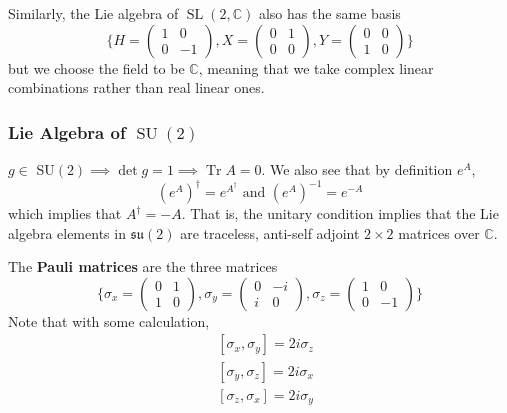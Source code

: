 \documentclass{article}
\DeclareMathOperator{\Tr}{Tr}
\DeclareMathOperator{\SU}{SU}
\DeclareMathOperator{\SL}{SL}
\begin{document}
      Similarly, the Lie algebra of $\SL(2, \mathbb{C})$ also has the same basis 
      \begin{equation}
        \bigg\{ H = \begin{pmatrix}
        1&0\\0&-1
        \end{pmatrix}, X = \begin{pmatrix}
        0&1\\0&0
        \end{pmatrix}, Y = \begin{pmatrix}
        0&0\\1&0
        \end{pmatrix}\bigg\}
      \end{equation}
      but we choose the field to be $\mathbb{C}$, meaning that we take complex linear combinations rather than real linear ones. 

    \subsubsection[Lie Algebra of SU(2)]{Lie Algebra of \(\SU(2)\)}

      $g \in $ SU$(2) \implies \det{g} = 1 \implies \Tr{A} = 0$. We also see that by definition $e^A$, 
      \begin{equation}
        (e^A)^\dagger = e^{A^\dagger} \text{ and } (e^A)^{-1} = e^{-A}
      \end{equation}
      which implies that $A^\dagger = - A$. That is, the unitary condition implies that the Lie algebra elements in $\mathfrak{su}(2)$ are traceless, anti-self adjoint $2 \times 2$ matrices over $\mathbb{C}$. 

      \begin{definition}
        The \textbf{Pauli matrices} are the three matrices
        \begin{equation}
          \bigg\{ \sigma_x = \begin{pmatrix}
          0&1\\1&0
          \end{pmatrix}, \sigma_y = \begin{pmatrix}
          0&-i\\i&0
          \end{pmatrix}, \sigma_z = \begin{pmatrix}
          1&0\\0&-1
          \end{pmatrix}\bigg\}
        \end{equation}
        Note that with some calculation, 
        \begin{align*}
          & [\sigma_x, \sigma_y] = 2 i \sigma_z \\
          & [\sigma_y, \sigma_z] = 2 i \sigma_x \\
          & [\sigma_z, \sigma_x] = 2 i \sigma_y
        \end{align*}
      \end{definition}
\end{document}
